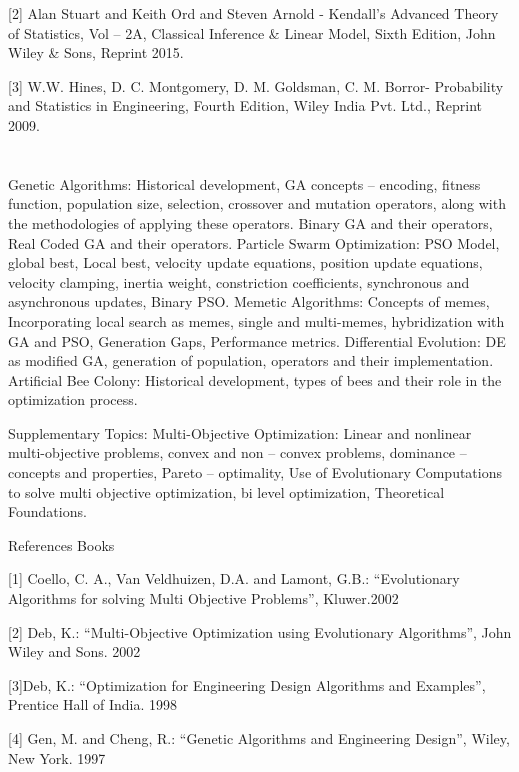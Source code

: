 [2] Alan Stuart and Keith Ord and Steven Arnold - Kendall’s Advanced Theory of Statistics, Vol – 2A, Classical Inference \& Linear Model, Sixth Edition, John Wiley \& Sons, Reprint 2015.

[3] W.W. Hines, D. C. Montgomery, D. M. Goldsman, C. M. Borror- Probability and Statistics in Engineering, Fourth Edition, Wiley India Pvt. Ltd., Reprint 2009.


\section{\courseinfo}

Genetic Algorithms: Historical development, GA concepts – encoding, fitness function, population size, selection, crossover and mutation operators, along with the methodologies of applying these operators. Binary GA and their operators, Real Coded GA and their operators.  Particle Swarm Optimization: PSO Model, global best, Local best, velocity update equations, position update equations, velocity clamping, inertia weight, constriction coefficients, synchronous and asynchronous updates, Binary PSO. Memetic Algorithms: Concepts of memes, Incorporating local search as memes, single and multi-memes, hybridization with GA and PSO, Generation Gaps, Performance metrics. Differential Evolution: DE as modified GA, generation of population, operators and their implementation. Artificial Bee Colony: Historical development, types of bees and their role in the optimization process. 

Supplementary Topics: Multi-Objective Optimization: Linear and nonlinear multi-objective problems, convex and non – convex problems, dominance – concepts and properties, Pareto – optimality, Use of Evolutionary Computations to solve multi objective optimization, bi level optimization, Theoretical Foundations. 

References Books 

[1] Coello, C. A., Van Veldhuizen, D.A. and Lamont, G.B.: “Evolutionary Algorithms for solving Multi Objective Problems”, Kluwer.2002 

[2] Deb, K.: “Multi-Objective Optimization using Evolutionary Algorithms”, John Wiley and Sons. 2002 

[3]Deb, K.: “Optimization for Engineering Design Algorithms and Examples”, Prentice Hall of India. 1998

[4] Gen, M. and Cheng, R.: “Genetic Algorithms and Engineering Design”, Wiley, New York. 1997

